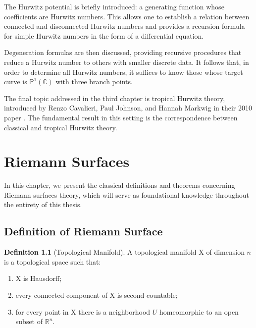 \documentclass[12pt,a4paper,openright,twoside]{report}
\theoremstyle{definition} %
\newtheorem{definition}[theorem]{Definition}
\def \R {\mathbb{R}}
\def \C {\mathbb{C}}
\def \PP {\mathbb{P}^1(\C)}
\begin{document}
    The Hurwitz potential is briefly introduced: a generating function whose coefficients are Hurwitz numbers. This allows one to establish a relation between connected and disconnected Hurwitz numbers and provides a recursion formula for simple Hurwitz numbers in the form of a differential equation.
    
    Degeneration formulas are then discussed, providing recursive procedures that reduce a Hurwitz number to others with smaller discrete data. It follows that, in order to determine all Hurwitz numbers, it suffices to know those whose target curve is \(\PP\) with three branch points.
    
    The final topic addressed in the third chapter is tropical Hurwitz theory, introduced by Renzo Cavalieri, Paul Johnson, and Hannah Markwig in their 2010 paper \cite{CJM10}. The fundamental result in this setting is the correspondence between classical and tropical Hurwitz theory.

	
	\clearpage{\pagestyle{empty}\cleardoublepage}
	\tableofcontents                        
	\rhead[\fancyplain{}{\bfseries\leftmark}]{\fancyplain{}{\bfseries\thepage}}
	\clearpage{\pagestyle{empty}\cleardoublepage}


\chapter{Riemann Surfaces}\label{chap:RiemannSurfaces}
\lhead[\fancyplain{}{\bfseries\thepage}]{\fancyplain{}{\bfseries\rightmark}}


In this chapter, we present the classical definitions and theorems concerning Riemann surfaces theory, which will serve as foundational knowledge throughout the entirety of this thesis.

\section{Definition of Riemann Surface}

\begin{definition}[Topological Manifold]
 A topological manifold X of dimension \(n\) is a topological space such that:
 \begin{enumerate}
     \item X is Hausdorff;
     \item every connected component of X is second countable;
     \item for every point in X there is a neighborhood \(U\) homeomorphic to an open subset of \(\R^n\).
 \end{enumerate}
\end{definition}
\end{document}
